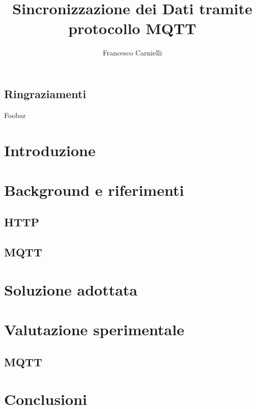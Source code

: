 \documentclass[a4paper, 12pt] {report}
\title {Sincronizzazione dei Dati tramite protocollo MQTT}
\author {Francesco Carnielli}
\date{}
\begin{document}
\maketitle

\newpage
\thispagestyle{empty}
\mbox{}

\newpage
\thispagestyle{empty}
\mbox{}

\section*{Ringraziamenti}
Foobar

\newpage
\thispagestyle{empty}
\mbox{}

\tableofcontents
\newpage

\clearpage
{}
\setcounter{page}{1}

\chapter{Introduzione}


\chapter{Background e riferimenti}

\section{HTTP}


\section{MQTT}


\chapter{Soluzione adottata}

\chapter{Valutazione sperimentale}

\section{MQTT}


\chapter{Conclusioni}

\medskip

\printbibliography[heading=bibintoc, title={Bibliografia}]
\end{document}
